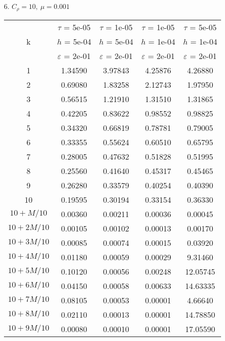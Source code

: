 6. $C_{\rho} = 10, \ \mu = 0.001$
\begin{center}
	\begin{tabular}{ |c|c|c|c|c| } 
		\hline
		& $\tau$ = 5e-05 & $\tau$ = 1e-05 & $\tau$ = 1e-05 & $\tau$ = 5e-05 \\ 
		k & $h$ = 5e-04 & $h$ = 5e-04 & $h$ = 1e-04 & $h$ = 1e-04 \\ 
		& $\varepsilon$ = 2e-01 & $\varepsilon$ = 2e-01 & $\varepsilon$ = 2e-01 & $\varepsilon$ = 2e-01 \\ 
		\hline
		1 & 1.34590 & 3.97843 & 4.25876 & 4.26880 \\
		\hline
		2 & 0.69080 & 1.83258 & 2.12743 & 1.97950 \\
		\hline
		3 & 0.56515 & 1.21910 & 1.31510 & 1.31865 \\
		\hline
		4 & 0.42205 & 0.83622 & 0.98552 & 0.98825 \\
		\hline
		5 & 0.34320 & 0.66819 & 0.78781 & 0.79005 \\
		\hline
		6 & 0.33355 & 0.55624 & 0.60510 & 0.65795 \\
		\hline
		7 & 0.28005 & 0.47632 & 0.51828 & 0.51995 \\
		\hline
		8 & 0.25560 & 0.41640 & 0.45317 & 0.45465 \\
		\hline
		9 & 0.26280 & 0.33579 & 0.40254 & 0.40390 \\
		\hline
		10 & 0.19595 & 0.30194 & 0.33154 & 0.36330 \\
		\hline
		$10 + M/10$ & 0.00360 & 0.00211 & 0.00036 & 0.00045 \\
		\hline
		$10 + 2M/10$ & 0.00105 & 0.00102 & 0.00013 & 0.00170 \\
		\hline
		$10 + 3M/10$ & 0.00085 & 0.00074 & 0.00015 & 0.03920 \\
		\hline
		$10 + 4M/10$ & 0.01180 & 0.00059 & 0.00029 & 9.31460 \\
		\hline
		$10 + 5M/10$ & 0.10120 & 0.00056 & 0.00248 & 12.05745 \\
		\hline
		$10 + 6M/10$ & 0.04150 & 0.00058 & 0.00633 & 14.63335 \\
		\hline
		$10 + 7M/10$ & 0.08105 & 0.00053 & 0.00001 & 4.66640 \\
		\hline
		$10 + 8M/10$ & 0.02110 & 0.00013 & 0.00001 & 14.78850 \\
		\hline
		$10 + 9M/10$ & 0.00080 & 0.00010 & 0.00001 & 17.05590 \\
		\hline
	\end{tabular}
\end{center}

